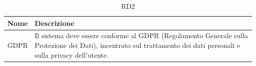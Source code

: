 \documentclass{natourDoc}
\begin{document}
	\begin{table}[H]
		\centering
		\begin{tabular}{ |p{5cm}|p{10.3cm}| }
			\hline
			\rowcolor{PineGreen!70}
			\textbf{Nome} & \textbf{Descrizione} \\
			\hline
			GDPR & Il sistema deve essere conforme al GDPR (Regolamento Generale sulla Protezione dei Dati), 
			incentrato sul trattamento dei dati personali e sulla privacy dell’utente.  \\
			\hline
		\end{tabular}
		\caption{RD2}
		\label{table:27}
	\end{table}

	\newpage
\end{document}
